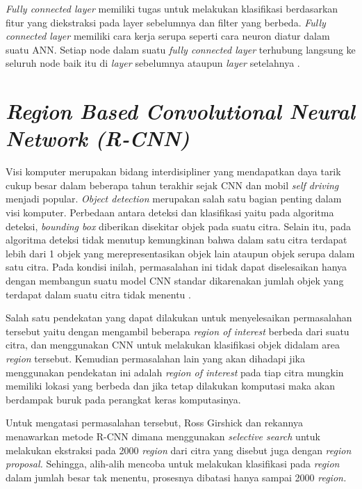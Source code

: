 \textit{Fully connected layer} memiliki tugas untuk melakukan klasifikasi berdasarkan fitur yang diekstraksi pada  layer sebelumnya dan filter yang berbeda. \textit{Fully connected layer} memiliki cara kerja serupa seperti cara neuron diatur dalam suatu ANN. Setiap node dalam suatu \textit{fully connected layer} terhubung langsung ke seluruh node baik itu di \textit{layer} sebelumnya ataupun \textit{layer} setelahnya \citep*{8308186}.

\section{\textit{Region Based Convolutional Neural Network (R-CNN)}}
\label{sec:regionbasedconvolutionalneuralnetwork}

Visi komputer merupakan bidang interdisipliner yang mendapatkan daya tarik cukup besar dalam beberapa tahun terakhir sejak CNN dan mobil \textit{self driving} menjadi popular. \textit{Object detection} merupakan salah satu bagian penting dalam visi komputer. Perbedaan antara deteksi dan klasifikasi yaitu pada algoritma deteksi, \textit{bounding box} diberikan disekitar objek pada suatu citra. Selain itu, pada algoritma deteksi tidak menutup kemungkinan bahwa dalam satu citra terdapat lebih dari 1 objek yang merepresentasikan objek lain ataupun objek serupa dalam satu citra. Pada kondisi inilah, permasalahan ini tidak dapat diselesaikan hanya dengan membangun suatu model CNN standar dikarenakan jumlah objek yang terdapat dalam suatu citra tidak menentu \citep*{Girshick_2014_CVPR}. \par

Salah satu pendekatan yang dapat dilakukan untuk menyelesaikan permasalahan tersebut yaitu dengan mengambil beberapa \textit{region of interest} berbeda dari suatu citra, dan menggunakan CNN untuk melakukan klasifikasi objek didalam area \textit{region} tersebut. Kemudian permasalahan lain yang akan dihadapi jika menggunakan pendekatan ini adalah \textit{region of interest} pada tiap citra mungkin memiliki lokasi yang berbeda dan jika tetap dilakukan komputasi maka akan berdampak buruk pada perangkat keras komputasinya. \par

Untuk mengatasi permasalahan tersebut, Ross Girshick dan rekannya menawarkan metode R-CNN dimana menggunakan \textit{selective search} untuk melakukan ekstraksi pada 2000 \textit{region} dari citra yang disebut juga dengan \textit{region proposal.} Sehingga, alih-alih mencoba untuk melakukan klasifikasi pada \textit{region} dalam jumlah besar tak menentu, prosesnya dibatasi hanya sampai 2000 \textit{region.}

